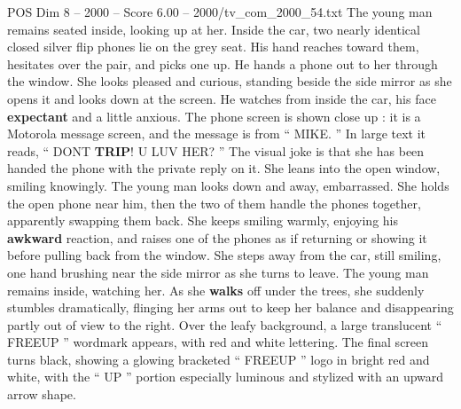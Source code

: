 \begin{textsample}{POS Dim 8 – 2000 – Score 6.00 – 2000/tv\_com\_2000\_54.txt}
The young man remains seated inside, looking up at her.
Inside the car, two nearly identical closed silver flip phones lie on the grey seat.
His hand reaches toward them, hesitates over the pair, and picks one up.
He hands a phone out to her through the window.
She looks pleased and curious, standing beside the side mirror as she opens it and looks down at the screen.
He watches from inside the car, his face \textbf{expectant} and a little anxious.
The phone screen is shown close up : it is a Motorola message screen, and the message is from “ MIKE. ” In large text it reads, “ DONT \textbf{TRIP}!
U LUV HER? ” The visual joke is that she has been handed the phone with the private reply on it.
She leans into the open window, smiling knowingly.
The young man looks down and away, embarrassed.
She holds the open phone near him, then the two of them handle the phones together, apparently swapping them back.
She keeps smiling warmly, enjoying his \textbf{awkward} reaction, and raises one of the phones as if returning or showing it before pulling back from the window.
She steps away from the car, still smiling, one hand brushing near the side mirror as she turns to leave.
The young man remains inside, watching her.
As she \textbf{walks} off under the trees, she suddenly stumbles dramatically, flinging her arms out to keep her balance and disappearing partly out of view to the right.
Over the leafy background, a large translucent “ FREEUP ” wordmark appears, with red and white lettering.
The final screen turns black, showing a glowing bracketed “ FREEUP ” logo in bright red and white, with the “ UP ” portion especially luminous and stylized with an upward arrow shape.

\end{textsample}
